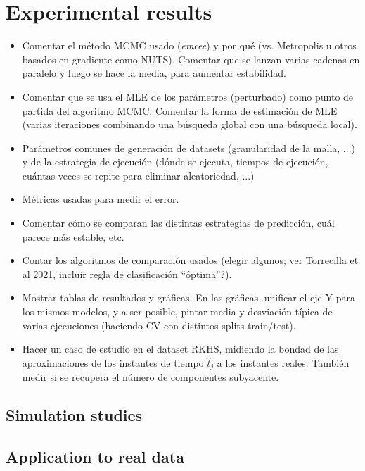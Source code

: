 \documentclass[ba]{imsart}
\numberwithin{equation}{section}
\theoremstyle{plain}
\newenvironment{comment}[1][comment-red]
{
\noindent \color{#1}
}
{
\color{black}
}
\begin{document}
\section{Experimental results}\label{sec:results}
\begin{comment}
  \begin{itemize}
    \item Comentar el método MCMC usado (\textit{emcee}) y por qué (vs. Metropolis u otros basados en gradiente como NUTS). Comentar que se lanzan varias cadenas en paralelo y luego se hace la media, para aumentar estabilidad.
    \item Comentar que se usa el MLE de los parámetros (perturbado) como punto de partida del algoritmo MCMC. Comentar la forma de estimación de MLE (varias iteraciones combinando una búsqueda global con una búsqueda local).
    \item Parámetros comunes de generación de datasets (granularidad de la malla, ...) y de la estrategia de ejecución (dónde se ejecuta, tiempos de ejecución, cuántas veces se repite para eliminar aleatoriedad, ...)
    \item Métricas usadas para medir el error.
    \item Comentar cómo se comparan las distintas estrategias de predicción, cuál parece más estable, etc.
    \item Contar los algoritmos de comparación usados (elegir algunos; ver Torrecilla et al 2021, incluir regla de clasificación ``óptima''?).
    \item Mostrar tablas de resultados y gráficas. En las gráficas, unificar el eje Y para los mismos modelos, y a ser posible, pintar media y desviación típica de varias ejecuciones (haciendo CV con distintos splits train/test).
    \item Hacer un caso de estudio en el dataset RKHS, midiendo la bondad de las aproximaciones de los instantes de tiempo \(\hat t_j\) a los instantes reales. También medir si se recupera el número de componentes subyacente.
\end{itemize}
\end{comment}

\subsection{Simulation studies}

\subsection{Application to real data}
\end{document}
